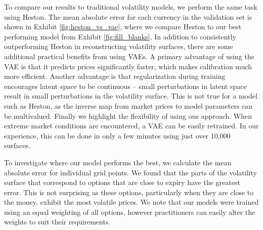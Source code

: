 \documentclass[12pt]{article}
\begin{document}
To compare our results to traditional volatility models, we perform the same task using Heston. The mean absolute error for each currency in the validation set is shown in Exhibit \ref{fig:heston_vs_vae}, where we compare Heston to our best performing model from Exhibit \ref{fig:fill_blanks}. In addition to consistently outperforming Heston in reconstructing volatility surfaces, there are some additional practical benefits from using VAEs. A primary advantage of using the VAE is that it predicts prices significantly faster, which makes calibration much more efficient. Another advantage is that regularization during training encourages latent space to be continuous -- small perturbations in latent space result in small perturbations in the volatility surface. This is not true for a model such as Heston, as the inverse map from market prices to model parameters can be multivalued.
Finally we highlight the flexibility of using our approach. When extreme market conditions are encountered, a VAE can be easily retrained. In our experience, this can be done in only a few minutes using just over 10,000 surfaces.


To investigate where our model performs the best, we calculate the mean absolute error for individual grid points.
We found that the parts of the volatility surface that correspond to options that are close to expiry have the greatest error. This is not surprising as these options, particularly when they are close to the money, exhibit the most volatile prices. We note that our models were trained using an equal weighting of all options, however practitioners can easily alter the weights to suit their requirements.
\end{document}
